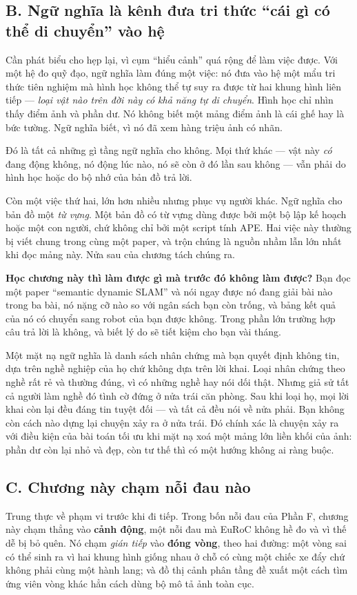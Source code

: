 \documentclass[../../deep_learning.tex]{subfiles}
\begin{document}
\subsection{B. Ngữ nghĩa là kênh đưa tri thức ``cái gì có thể di chuyển'' vào hệ}
Cần phát biểu cho hẹp lại, vì cụm ``hiểu cảnh'' quá rộng để làm việc được. Với một hệ đo quỹ đạo, ngữ nghĩa làm đúng một việc: nó đưa vào hệ một mẩu tri thức tiên nghiệm mà hình học không thể tự suy ra được từ hai khung hình liên tiếp --- \emph{loại vật nào trên đời này có khả năng tự di chuyển}. Hình học chỉ nhìn thấy điểm ảnh và phần dư. Nó không biết một mảng điểm ảnh là cái ghế hay là bức tường. Ngữ nghĩa biết, vì nó đã xem hàng triệu ảnh có nhãn.

Đó là tất cả những gì tầng ngữ nghĩa cho không. Mọi thứ khác --- vật này \emph{có} đang động không, nó động lúc nào, nó sẽ còn ở đó lần sau không --- vẫn phải do hình học hoặc do bộ nhớ của bản đồ trả lời.

Còn một việc thứ hai, lớn hơn nhiều nhưng phục vụ người khác. Ngữ nghĩa cho bản đồ một \emph{từ vựng}. Một bản đồ có từ vựng dùng được bởi một bộ lập kế hoạch hoặc một con người, chứ không chỉ bởi một script tính APE. Hai việc này thường bị viết chung trong cùng một paper, và trộn chúng là nguồn nhầm lẫn lớn nhất khi đọc mảng này. Nửa sau của chương tách chúng ra.

\textbf{Học chương này thì làm được gì mà trước đó không làm được?} Bạn đọc một paper ``semantic dynamic SLAM'' và nói ngay được nó đang giải bài nào trong ba bài, nó nặng cỡ nào so với ngân sách bạn còn trống, và bảng kết quả của nó có chuyển sang robot của bạn được không. Trong phần lớn trường hợp câu trả lời là không, và biết lý do sẽ tiết kiệm cho bạn vài tháng.

\begin{trucgiac}
Một mặt nạ ngữ nghĩa là danh sách nhân chứng mà bạn quyết định không tin, dựa trên nghề nghiệp của họ chứ không dựa trên lời khai. Loại nhân chứng theo nghề rất rẻ và thường đúng, vì có những nghề hay nói dối thật. Nhưng giả sử tất cả người làm nghề đó tình cờ đứng ở nửa trái căn phòng. Sau khi loại họ, mọi lời khai còn lại đều đáng tin tuyệt đối --- và tất cả đều nói về nửa phải. Bạn không còn cách nào dựng lại chuyện xảy ra ở nửa trái. Đó chính xác là chuyện xảy ra với điều kiện của bài toán tối ưu khi mặt nạ xoá một mảng lớn liền khối của ảnh: phần dư còn lại nhỏ và đẹp, còn tư thế thì có một hướng không ai ràng buộc.
\end{trucgiac}

\subsection{C. Chương này chạm nỗi đau nào}
Trung thực về phạm vi trước khi đi tiếp. Trong bốn nỗi đau của Phần F, chương này chạm thẳng vào \textbf{cảnh động}, một nỗi đau mà EuRoC không hề đo và vì thế dễ bị bỏ quên. Nó chạm \emph{gián tiếp} vào \textbf{đóng vòng}, theo hai đường: một vòng sai có thể sinh ra vì hai khung hình giống nhau ở chỗ có cùng một chiếc xe đẩy chứ không phải cùng một hành lang; và đồ thị cảnh phân tầng đề xuất một cách tìm ứng viên vòng khác hẳn cách dùng bộ mô tả ảnh toàn cục.
\end{document}

